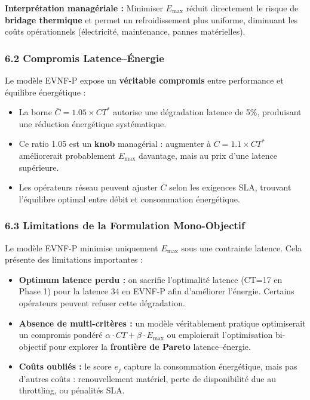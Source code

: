 \documentclass{article}
\begin{document}
\textbf{Interprétation managériale :} Minimiser $E_{\max}$ réduit directement le risque de \textbf{bridage thermique} et permet un refroidissement plus uniforme, diminuant les coûts opérationnels (électricité, maintenance, pannes matérielles).

\subsubsection{6.2 Compromis Latence--Énergie}

Le modèle EVNF-P expose un \textbf{véritable compromis} entre performance et équilibre énergétique :
\begin{itemize}
    \item La borne $\bar{C} = 1.05 \times CT^*$ autorise une dégradation latence de 5\%, produisant une réduction énergétique systématique.
    \item Ce ratio 1.05 est un \textbf{knob} managérial : augmenter à $\bar{C} = 1.1 \times CT^*$ améliorerait probablement $E_{\max}$ davantage, mais au prix d'une latence supérieure.
    \item Les opérateurs réseau peuvent ajuster $\bar{C}$ selon les exigences SLA, trouvant l'équilibre optimal entre débit et consommation énergétique.
\end{itemize}

\subsubsection{6.3 Limitations de la Formulation Mono-Objectif}

Le modèle EVNF-P minimise uniquement $E_{\max}$ sous une contrainte latence. Cela présente des limitations importantes :
\begin{itemize}
    \item \textbf{Optimum latence perdu :} on sacrifie l'optimalité latence (CT=17 en Phase 1) pour la latence 34 en EVNF-P afin d'améliorer l'énergie. Certains opérateurs peuvent refuser cette dégradation.
    \item \textbf{Absence de multi-critères :} un modèle véritablement pratique optimiserait un compromis pondéré $\alpha \cdot CT + \beta \cdot E_{\max}$ ou emploierait l'optimisation bi-objectif pour explorer la \textbf{frontière de Pareto} latence--énergie.
    \item \textbf{Coûts oubliés :} le score $e_j$ capture la consommation énergétique, mais pas d'autres coûts : renouvellement matériel, perte de disponibilité due au throttling, ou pénalités SLA.
\end{itemize}
\end{document}
